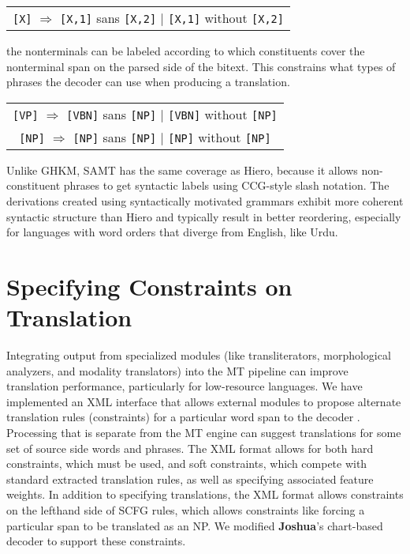 \documentclass[11pt]{article}
\newcommand{\joshua}{\textbf{Joshua}\xspace}
\begin{document}
\noindent
\begin{tabular}{c}
  {\small \tt [X]} $\Rightarrow$ {\small \tt [X,1]} sans {\small \tt [X,2]} 
  $\vert$ {\tt \small [X,1]} without {\small \tt [X,2]}
\end{tabular}

\noindent
the nonterminals can be labeled according to
which constituents cover the nonterminal span on the parsed side of
the bitext.  This constrains what types of phrases the decoder can use when producing a translation.

\noindent
\begin{tabular}{c}
  {\small \tt [VP]} $\Rightarrow$ {\small \tt [VBN]} sans {\small
    \tt [NP]} $\vert$ {\small \tt [VBN]} without {\small \tt [NP]} \\
  {\small \tt [NP]} $\Rightarrow$ {\small \tt [NP]} sans {\small
    \tt [NP]} 
  $\vert$ {\small \tt [NP]} without {\small \tt [NP]} 
\end{tabular}

\noindent
Unlike GHKM, SAMT has the same coverage as Hiero, because it allows non-constituent phrases to get syntactic
labels using CCG-style slash notation. 
The derivations created using syntactically motivated grammars exhibit more coherent syntactic structure than Hiero and typically result in better reordering, especially for languages with word orders that diverge from English, like Urdu.

\section{Specifying Constraints on Translation}

Integrating output from specialized modules (like transliterators, morphological analyzers, and modality translators) into the MT pipeline can improve translation performance, particularly for low-resource languages. We have implemented an XML interface that allows external modules to propose alternate translation rules (constraints) for a particular word span to the decoder \cite{PBML-2010-Joshua-modules}. Processing that is separate from the MT engine can suggest translations for some set of source side words and phrases. The XML format allows for both hard constraints, which must be used, and soft constraints, which compete with standard extracted translation rules, as well as specifying associated feature weights. In addition to specifying translations, the XML format allows constraints on the lefthand side of SCFG rules, which allows constraints like forcing a particular span to be translated as an NP.  We modified \joshua's chart-based decoder to support these constraints. 
\end{document}
